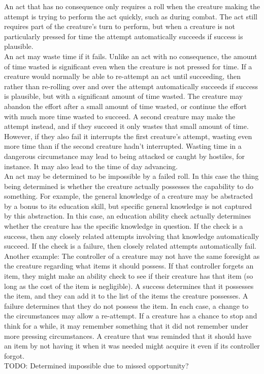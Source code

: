 \documentclass[letterpaper,titlepage,openany,twocolumn]{book}
\begin{document}
An act that has no consequence only requires a  roll when the creature making the attempt is trying to perform the act quickly, such as during combat. The act still requires part of the creature’s turn to perform, but when a creature is not particularly pressed for time the attempt automatically succeeds if success is plausible.\\

An act may waste time if it fails. Unlike an act with no consequence, the amount of time wasted is significant even when the creature is not pressed for time. If a creature would normally be able to re-attempt an act until succeeding, then rather than re-rolling over and over the attempt automatically succeeds if success is plausible, but with a significant amount of time wasted. The creature may abandon the effort after a small amount of time wasted, or continue the effort with much more time wasted to succeed. A second creature may make the attempt instead, and if they succeed it only wastes that small amount of time. However, if they also fail it interrupts the first creature’s attempt, wasting even more time than if the second creature hadn’t interrupted. Wasting time in a dangerous circumstance may lead to being attacked or caught by hostiles, for instance. It may also lead to the time of day advancing.\\

An act may be determined to be impossible by a failed roll. In this case the thing being determined is whether the creature actually possesses the capability to do something. For example, the general knowledge of a creature may be abstracted by a bonus to its education skill, but specific general knowledge is not captured by this abstraction. In this case, an education ability check actually determines whether the creature has the specific knowledge in question. If the check is a success, then any closely related attempts involving that knowledge automatically succeed. If the check is a failure, then closely related attempts automatically fail. Another example: The controller of a creature may not have the same foresight as the creature regarding what items it should possess. If that controller forgets an item, they might make an ability check to see if their creature has that item (so long as the cost of the item is negligible). A success determines that it possesses the item, and they can add it to the list of the items the creature possesses. A failure determines that they do not possess the item. In each case, a change to the circumstances may allow a re-attempt. If a creature has a chance to stop and think for a while, it may remember something that it did not remember under more pressing circumstances. A creature that was reminded that it should have an item by not having it when it was needed might acquire it even if its controller forgot.\\
TODO: Determined impossible due to missed opportunity?\\
\end{document}
